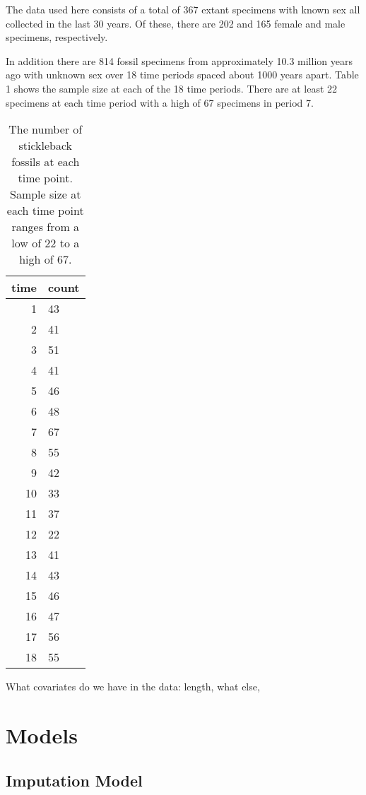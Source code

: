 \documentclass[
  12pt,
]{article}
\begin{document}
The data used here consists of a total of 367 extant specimens with
known sex all collected in the last 30 years. Of these, there are 202
and 165 female and male specimens, respectively.

In addition there are 814 fossil specimens from approximately 10.3
million years ago with unknown sex over 18 time periods spaced about
1000 years apart. Table 1 shows the sample size at each of the 18 time
periods. There are at least 22 specimens at each time period with a high
of 67 specimens in period 7.

\begin{table}[ht]
\centering
\begin{tabular}{rl}
  \hline
time & count \\ 
  \hline
  1 & 43 \\ 
    2 & 41 \\ 
    3 & 51 \\ 
    4 & 41 \\ 
    5 & 46 \\ 
    6 & 48 \\ 
    7 & 67 \\ 
    8 & 55 \\ 
    9 & 42 \\ 
   10 & 33 \\ 
   11 & 37 \\ 
   12 & 22 \\ 
   13 & 41 \\ 
   14 & 43 \\ 
   15 & 46 \\ 
   16 & 47 \\ 
   17 & 56 \\ 
   18 & 55 \\ 
   \hline
\end{tabular}
\label{tab1}
\caption{The number of stickleback fossils at each time point.  Sample size at each time point ranges from a low of 22 to a high of 67.}
\end{table}

What covariates do we have in the data: length, what else,

\hypertarget{sec:models}{%
\section{Models}\label{sec:models}}

\hypertarget{imputation-model}{%
\subsection{Imputation Model}\label{imputation-model}}
\end{document}
